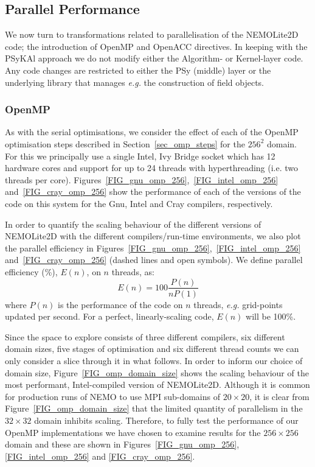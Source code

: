 \documentclass[gmd, manuscript]{copernicus}
\begin{document}
\subsection{Parallel Performance}

We now turn to transformations related to parallelisation of the
NEMOLite2D code; the introduction of OpenMP and OpenACC directives. In
keeping with the {PS}y{KA}l approach we do not modify either the
Algorithm- or Kernel-layer code.  Any code changes are restricted to
either the PSy (middle) layer or the underlying library that manages
\textit{e.g.} the construction of field objects.

\subsubsection{OpenMP}

As with the serial optimisations, we consider the effect of each of
the OpenMP optimisation steps described in Section~\ref{sec_omp_steps}
for the $256^2$ domain. For this we principally use a single Intel,
Ivy Bridge socket which has 12 hardware cores and support for up to 24
threads with hyperthreading (i.e. two threads per core).
Figures~\ref{FIG_gnu_omp_256},~\ref{FIG_intel_omp_256}
and~\ref{FIG_cray_omp_256} show the performance of each of the
versions of the code on this system for the Gnu, Intel and Cray
compilers, respectively.

In order to quantify the scaling behaviour of the different versions
of NEMOLite2D with the different compilers/run-time environments, we
also plot the parallel efficiency in
Figures~\ref{FIG_gnu_omp_256},~\ref{FIG_intel_omp_256}
and~\ref{FIG_cray_omp_256} (dashed lines and open symbols). We define
parallel efficiency (\%), $E(n)$, on $n$ threads, as:
\[
E(n) = 100  \frac{P(n)}{ n P(1)}
\]
where $P(n)$ is the performance of the code on $n$ threads,
\textit{e.g.} grid-points updated per second. For a
perfect, linearly-scaling code, $E(n)$ will be 100\%.

Since the space to explore consists of three different compilers, six
different domain sizes, five stages of optimisation and six different
thread counts we can only consider a slice through it in what follows.
In order to inform our choice of domain size,
Figure~\ref{FIG_omp_domain_size} shows the scaling behaviour of the
most performant, Intel-compiled version of NEMOLite2D. Although it is
common for production runs of NEMO to use MPI sub-domains of $20
\times 20$, it is clear from Figure~\ref{FIG_omp_domain_size} that the
limited quantity of parallelism in the $32 \times 32$ domain inhibits
scaling. Therefore, to fully test the performance of our OpenMP
implementations we have chosen to examine results for the $256 \times
256$ domain and these are shown in Figures~\ref{FIG_gnu_omp_256},
\ref{FIG_intel_omp_256} and \ref{FIG_cray_omp_256}.
\end{document}

